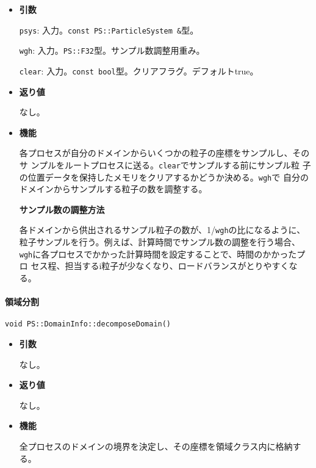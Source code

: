 \begin{itemize}

\item{{\bf 引数}}

{\tt psys}: 入力。{\tt const PS::ParticleSystem \&}型。

{\tt wgh}: 入力。{\tt PS::F32}型。サンプル数調整用重み。

{\tt clear}: 入力。{\tt const bool}型。クリアフラグ。デフォルトtrue。

\item{{\bf 返り値}}

なし。

\item{{\bf 機能}}

各プロセスが自分のドメインからいくつかの粒子の座標をサンプルし、そのサ
ンプルをルートプロセスに送る。\verb|clear|でサンプルする前にサンプル粒
子の位置データを保持したメモリをクリアするかどうか決める。\verb|wgh|で
自分のドメインからサンプルする粒子の数を調整する。

{\bf サンプル数の調整方法}

各ドメインから供出されるサンプル粒子の数が、1/{\tt wgh}の比になるように、
粒子サンプルを行う。例えば、計算時間でサンプル数の調整を行う場合、{\tt
wgh}に各プロセスでかかった計算時間を設定することで、時間のかかったプロ
セス程、担当するi粒子が少なくなり、ロードバランスがとりやすくなる。


\end{itemize}



\paragraph{領域分割}
\mbox{}

\begin{screen}
\begin{verbatim}
void PS::DomainInfo::decomposeDomain()
\end{verbatim}
\end{screen}

\begin{itemize}

\item{{\bf 引数}}

なし。

\item{{\bf 返り値}}

なし。

\item{{\bf 機能}}

全プロセスのドメインの境界を決定し、その座標を領域クラス内に格納する。

\end{itemize}

